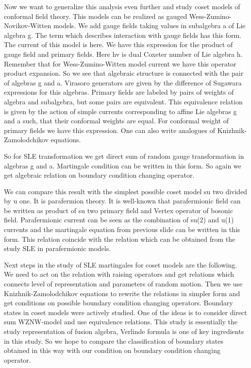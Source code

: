 \documentclass[12pt]{article}
\theoremstyle{definition}
\theoremstyle{definition} \newtheorem{Def}{Definition}
\begin{document}
Now we want to generalize this analysis even further and study coset models of conformal field theory. This models can be realized as gauged Wess-Zumino-Novikov-Witten models. We add gauge fields taking values in subalgebra a of Lie algebra g. The term which describes interaction with gauge fields has this form. 
The current of this model is here. 
We have this expression for the product of gauge field and primary fields. Here hv is dual Coxeter number of Lie algebra h.
Remember that for Wess-Zumino-Witten model current we have this operator product expansion. So we see that algebraic structure is connected with the pair of algebras g and a. Virasoro generators are given by the difference of Sugawara expressions for this algebras. 
Primary fields are labeled by pairs of weights of algebra and subalgebra, but some pairs are equivalent. This equivalence relation is given by the action of simple currents corresponding to affine Lie algebras g and a such, that their conformal weights are equal. 
For conformal weight of primary fields we have this expression. 
One can also write analogues of Knizhnik-Zamolodchikov equations.

So for SLE transformation we get direct sum of random gauge transformation in algebras g and a. Martingale condition can be written in this form. So again we get algebraic relation on boundary condition changing operator. 

We can compare this result with the simplest possible coset model su two divided by u one. It is parafermion theory. It is well-known that parafermionic field can be written as product of su two primary field and Vertex operator of bosonic field. 
Parafermionic current can be seen as the combination of su(2) and u(1) currents and the martingale equation from previous slide can be written in this form. This relation coincide with the relation which can be obtained from the study SLE in  parafermionic models. 

Next steps in the study of SLE martingales for coset models  are the following. We need to act on the relation with raising operators and get relations which connects level of representation and parameters of random motion. Then we use Knizhnik-Zamolodchikov equations to rewrite the relations in simpler form and get conditions on possible boundary condition changing operators. 
Boundary states in coset models were actively studied. One of the ideas is to consider direct sum WZNW-model and use equivalence relations. This study is essentially the study representation of fusion algebra, Verlinde formula is one of key ingredients in this study. So we hope to compare the classification of boundary states obtained in this way with our condition on boundary condition changing operator. 
\end{document}
